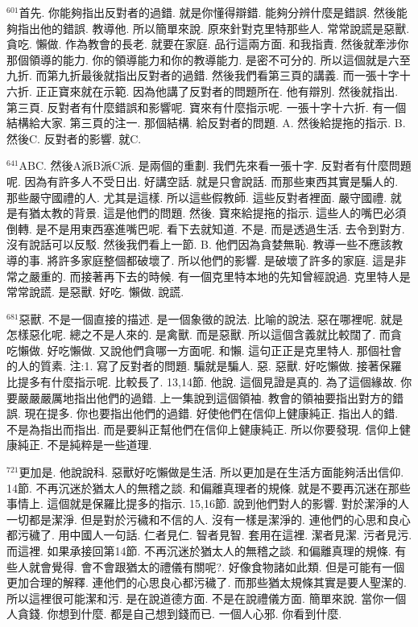 \documentclass{book}
\begin{document}
$^{601}$首先.
你能夠指出反對者的過錯.
就是你懂得辯錯.
能夠分辨什麼是錯誤.
然後能夠指出他的錯誤.
教導他.
所以簡單來說.
原來針對克里特那些人.
常常說謊是惡獸.
貪吃.
懶做.
作為教會的長老.
就要在家庭.
品行這兩方面.
和我指責.
然後就牽涉你那個領導的能力.
你的領導能力和你的教導能力.
是密不可分的.
所以這個就是六至九折.
而第九折最後就指出反對者的過錯.
然後我們看第三頁的講義.
而一張十字十六折.
正正寶來就在示範.
因為他講了反對者的問題所在.
他有辯別.
然後就指出.
第三頁.
反對者有什麼錯誤和影響呢.
寶來有什麼指示呢.
一張十字十六折.
有一個結構給大家.
第三頁的注一.
那個結構.
給反對者的問題.
A.
然後給提拖的指示.
B.
然後C.
反對者的影響.
就C.

$^{641}$ABC.
然後A派B派C派.
是兩個的重劃.
我們先來看一張十字.
反對者有什麼問題呢.
因為有許多人不受日出.
好講空話.
就是只會說話.
而那些東西其實是騙人的.
那些嚴守國禮的人.
尤其是這樣.
所以這些假教師.
這些反對者裡面.
嚴守國禮.
就是有猶太教的背景.
這是他們的問題.
然後.
寶來給提拖的指示.
這些人的嘴巴必須倒轉.
是不是用東西塞進嘴巴呢.
看下去就知道.
不是.
而是透過生活.
去令到對方.
沒有說話可以反駁.
然後我們看上一節.
B.
他們因為貪婪無恥.
教導一些不應該教導的事.
將許多家庭整個都破壞了.
所以他們的影響.
是破壞了許多的家庭.
這是非常之嚴重的.
而接著再下去的時候.
有一個克里特本地的先知曾經說過.
克里特人是常常說謊.
是惡獸.
好吃.
懶做.
說謊.

$^{681}$惡獸.
不是一個直接的描述.
是一個象徵的說法.
比喻的說法.
惡在哪裡呢.
就是怎樣惡化呢.
總之不是人來的.
是禽獸.
而是惡獸.
所以這個含義就比較闊了.
而貪吃懶做.
好吃懶做.
又說他們貪哪一方面呢.
和懶.
這句正正是克里特人.
那個社會的人的質素.
注:1.
寫了反對者的問題.
騙就是騙人.
惡.
惡獸.
好吃懶做.
接著保羅比提多有什麼指示呢.
比較長了.
13,14節.
他說.
這個見證是真的.
為了這個緣故.
你要嚴嚴嚴厲地指出他們的過錯.
上一集說到這個領袖.
教會的領袖要指出對方的錯誤.
現在提多.
你也要指出他們的過錯.
好使他們在信仰上健康純正.
指出人的錯.
不是為指出而指出.
而是要糾正幫他們在信仰上健康純正.
所以你要發現.
信仰上健康純正.
不是純粹是一些道理.

$^{721}$更加是.
他說說科.
惡獸好吃懶做是生活.
所以更加是在生活方面能夠活出信仰.
14節.
不再沉迷於猶太人的無稽之談.
和偏離真理者的規條.
就是不要再沉迷在那些事情上.
這個就是保羅比提多的指示.
15,16節.
說到他們對人的影響.
對於潔淨的人一切都是潔淨.
但是對於污穢和不信的人.
沒有一樣是潔淨的.
連他們的心思和良心都污穢了.
用中國人一句話.
仁者見仁.
智者見智.
套用在這裡.
潔者見潔.
污者見污.
而這裡.
如果承接回第14節.
不再沉迷於猶太人的無稽之談.
和偏離真理的規條.
有些人就會覺得.
會不會跟猶太的禮儀有關呢?.
好像食物諸如此類.
但是可能有一個更加合理的解釋.
連他們的心思良心都污穢了.
而那些猶太規條其實是要人聖潔的.
所以這裡很可能潔和污.
是在說道德方面.
不是在說禮儀方面.
簡單來說.
當你一個人貪錢.
你想到什麼.
都是自己想到錢而已.
一個人心邪.
你看到什麼.
\end{document}
